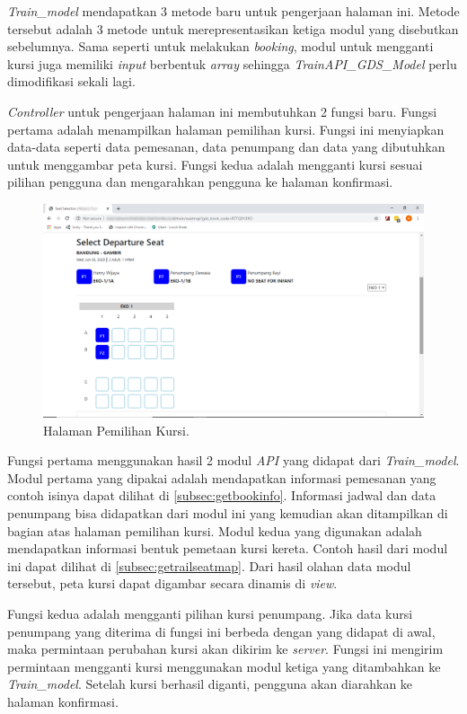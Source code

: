 \textit{Train\_model} mendapatkan 3 metode baru untuk pengerjaan halaman ini. Metode tersebut adalah 3 metode untuk merepresentasikan ketiga modul yang disebutkan sebelumnya. Sama seperti untuk melakukan \textit{booking}, modul untuk mengganti kursi juga memiliki \textit{input} berbentuk \textit{array} sehingga \textit{TrainAPI\_GDS\_Model} perlu dimodifikasi sekali lagi.

\textit{Controller} untuk pengerjaan halaman ini membutuhkan 2 fungsi baru. Fungsi pertama adalah menampilkan halaman pemilihan kursi. Fungsi ini menyiapkan data-data seperti data pemesanan, data penumpang dan data yang dibutuhkan untuk menggambar peta kursi. Fungsi kedua adalah mengganti kursi sesuai pilihan pengguna dan mengarahkan pengguna ke halaman konfirmasi.

\begin{figure}[H]
        \center
        \includegraphics[width=\textwidth,height=\textheight,keepaspectratio]{Gambar/Seat Selection Depart.png}
        \caption{Halaman Pemilihan Kursi.}
            \label{img:pilihkursi1}
        \end{figure}


Fungsi pertama menggunakan hasil 2 modul \textit{API} yang didapat dari \textit{Train\_model}. Modul pertama yang dipakai adalah mendapatkan informasi pemesanan yang contoh isinya dapat dilihat di \ref{subsec:getbookinfo}. Informasi jadwal dan data penumpang bisa didapatkan dari modul ini yang kemudian akan ditampilkan di bagian atas halaman pemilihan kursi. Modul kedua yang digunakan adalah mendapatkan informasi bentuk pemetaan kursi kereta. Contoh hasil dari modul ini dapat dilihat di \ref{subsec:getrailseatmap}. Dari hasil olahan data modul tersebut, peta kursi dapat digambar secara dinamis di \textit{view}.

Fungsi kedua adalah mengganti pilihan kursi penumpang. Jika data kursi penumpang yang diterima di fungsi ini berbeda dengan yang didapat di awal, maka permintaan perubahan kursi akan dikirim ke \textit{server}. Fungsi ini mengirim permintaan mengganti kursi menggunakan modul ketiga yang ditambahkan ke \textit{Train\_model}. Setelah kursi berhasil diganti, pengguna akan diarahkan ke halaman konfirmasi.

